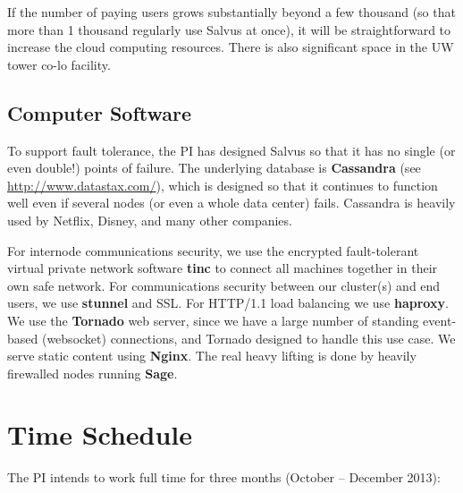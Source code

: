 \documentclass[11pt]{article}
\begin{document}
If the number of paying users grows substantially beyond a few
thousand (so that more than 1 thousand regularly use Salvus at once),
it will be straightforward to increase the cloud computing resources.
There is also significant space in the UW tower co-lo facility.

\subsection{Computer Software}

To support fault tolerance, the PI has designed Salvus so that it has
no single (or even double!) points of failure.  The underlying
database is {\bf Cassandra} (see \url{http://www.datastax.com/}),
which is designed so that it continues to function well even if
several nodes (or even a whole data center) fails.  Cassandra is
heavily used by Netflix, Disney, and many other companies.

For internode communications security, we use the encrypted
fault-tolerant virtual private network software {\bf tinc} to connect
all machines together in their own safe network.  For communications
security between our cluster(s) and end users, we use {\bf stunnel}
and SSL.  For HTTP/1.1 load balancing we use {\bf haproxy}.  We use
the {\bf Tornado} web server, since we have a large number of standing
event-based (websocket) connections, and Tornado designed to handle
this use case.  We serve static content using {\bf Nginx}.  The real
heavy lifting is done by heavily firewalled nodes running {\bf Sage}.


\section{Time Schedule}

The PI intends to work full time for three months (October -- December 2013):
\end{document}
